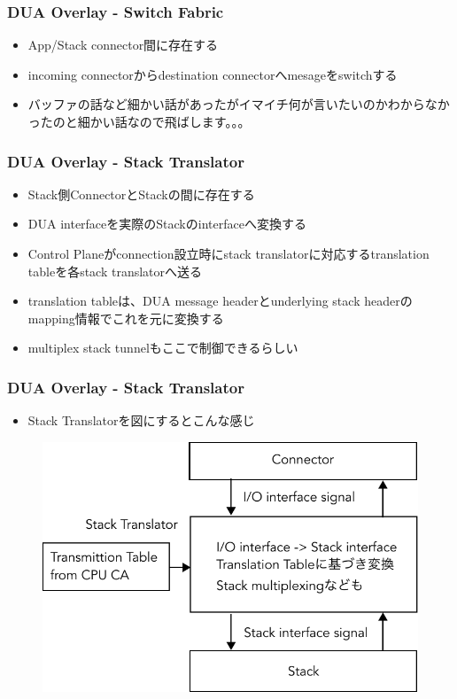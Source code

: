 \documentclass[dvipdfmx,9pt,notheorems]{beamer}
\theoremstyle{definition}
\begin{document}
\begin{frame}\frametitle{DUA Overlay - Switch Fabric}
	\begin{itemize}
		\item App/Stack connector間に存在する
		\item incoming connectorからdestination connectorへmesageをswitchする
		\item バッファの話など細かい話があったがイマイチ何が言いたいのかわからなかったのと細かい話なので飛ばします。。。
	\end{itemize}
\pnote{
}
\end{frame}

\begin{frame}\frametitle{DUA Overlay - Stack Translator}
	\begin{itemize}
		\item Stack側ConnectorとStackの間に存在する
		\item DUA interfaceを実際のStackのinterfaceへ変換する
		\item Control Planeがconnection設立時にstack translatorに対応するtranslation tableを各stack translatorへ送る
		\item translation tableは、DUA message headerとunderlying stack headerのmapping情報でこれを元に変換する
		\item multiplex stack tunnelもここで制御できるらしい
	\end{itemize}
\end{frame}

\begin{frame}\frametitle{DUA Overlay - Stack Translator}
	\begin{itemize}
		\item Stack Translatorを図にするとこんな感じ
		\end{itemize}
  \begin{figure}[htb]
		\includegraphics[scale=0.5]{fig/ez_DUA_DataPlane_StackTranslator.pdf}
  \end{figure}
\pnote{
}
\end{frame}
\end{document}
